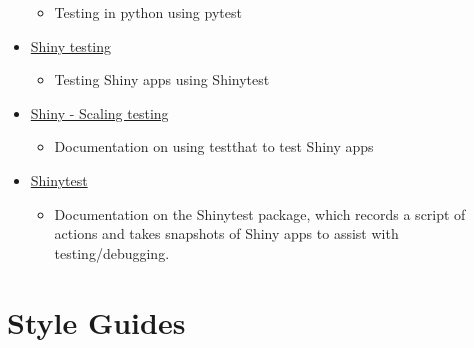 \documentclass[
]{book}
\providecommand{\tightlist}{%
  \setlength{\itemsep}{0pt}\setlength{\parskip}{0pt}}
\begin{document}
\begin{itemize}
  \begin{itemize}
  \tightlist
  \item
    Testing in python using pytest
  \end{itemize}
\item
  \href{https://shiny.rstudio.com/articles/testing-overview.html}{Shiny testing}

  \begin{itemize}
  \tightlist
  \item
    Testing Shiny apps using Shinytest
  \end{itemize}
\item
  \href{https://mastering-shiny.org/scaling-testing.html}{Shiny - Scaling testing}

  \begin{itemize}
  \tightlist
  \item
    Documentation on using testthat to test Shiny apps
  \end{itemize}
\item
  \href{https://rstudio.github.io/shinytest/articles/shinytest.html}{Shinytest}

  \begin{itemize}
  \tightlist
  \item
    Documentation on the Shinytest package, which records a script of actions and takes snapshots of Shiny apps to assist with testing/debugging.
  \end{itemize}
\end{itemize}

\hypertarget{style-guides}{%
\section{Style Guides}\label{style-guides}}
\end{document}
